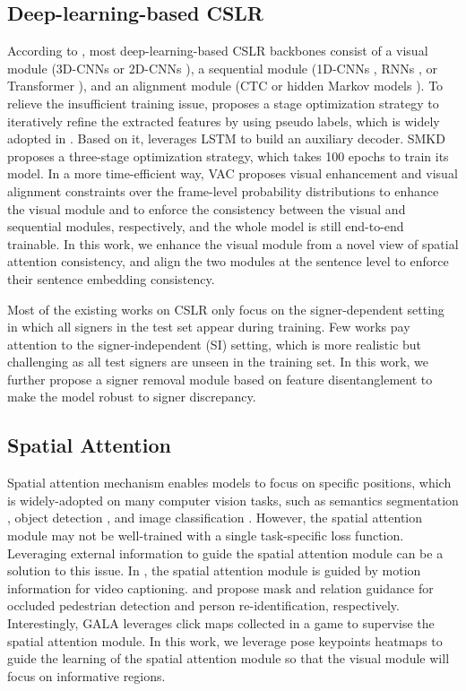 \documentclass[acmsmall,screen]{acmart}
\begin{document}
\subsection{Deep-learning-based CSLR}
According to \cite{sfl}, most deep-learning-based CSLR backbones consist of a visual module (3D-CNNs \cite{iopt, csl-3} or 2D-CNNs \cite{stmc, vac, self-mutual}), a sequential module (1D-CNNs \cite{dense, fcn}, RNNs \cite{stmc, vac, self-mutual, iopt, cma}, or Transformer \cite{sfl, slt}), and an alignment module (CTC \cite{stmc, vac, self-mutual} or hidden Markov models \cite{cnn-lstm-hmm, deep-sign}).
To relieve the insufficient training issue, \cite{dnf} proposes a stage optimization strategy to iteratively refine the extracted features by using pseudo labels, which is widely adopted in \cite{iopt, cma, stmc, self-mutual}.
Based on it, \cite{iopt} leverages LSTM to build an auxiliary decoder.
SMKD \cite{self-mutual} proposes a three-stage optimization strategy, which takes 100 epochs to train its model.
In a more time-efficient way, VAC \cite{vac} proposes visual enhancement and visual alignment constraints over the frame-level probability distributions to enhance the visual module and to enforce the consistency between the visual and sequential modules, respectively, and the whole model is still end-to-end trainable.
In this work, we enhance the visual module from a novel view of spatial attention consistency, and align the two modules at the sentence level to enforce their sentence embedding consistency.

Most of the existing works on CSLR only focus on the signer-dependent setting in which all signers in the test set appear during training.
Few works pay attention to the signer-independent (SI) setting, which is more realistic but challenging as all test signers are unseen in the training set.
In this work, we further propose a signer removal module based on feature disentanglement to make the model robust to signer discrepancy.


\subsection{Spatial Attention}
Spatial attention mechanism enables models to focus on specific positions, which is widely-adopted on many computer vision tasks, such as semantics segmentation \cite{fu2019dual}, object detection \cite{woo2018cbam, cao2019gcnet}, and image classification \cite{woo2018cbam, cao2019gcnet, hu2018gather, wang2017residual, linsley2018learning}.
However, the spatial attention module may not be well-trained with a single task-specific loss function.
Leveraging external information to guide the spatial attention module can be a solution to this issue.
In \cite{chen2019motion}, the spatial attention module is guided by motion information for video captioning.
\cite{pang2019mask} and \cite{li2020relation} propose mask and relation guidance for occluded pedestrian detection and person re-identification, respectively.
Interestingly, GALA \cite{linsley2018learning} leverages click maps collected in a game to supervise the spatial attention module.
In this work, we leverage pose keypoints heatmaps to guide the learning of the spatial attention module so that the visual module will focus on informative regions.
\end{document}
